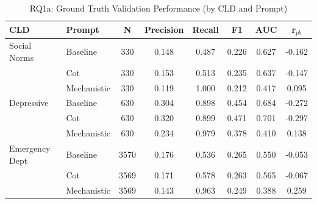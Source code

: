 \begin{table}[htbp]
\centering
\caption{RQ1a: Ground Truth Validation Performance (by CLD and Prompt)}
\label{tab:rq1a_gt_main}
\begin{tabular}{llcccccc}
\toprule
\textbf{CLD} & \textbf{Prompt} & \textbf{N} & \textbf{Precision} & \textbf{Recall} & \textbf{F1} & \textbf{AUC} & \textbf{r$_{pb}$} \\
\midrule
Social Norms & Baseline & 330 & 0.148 & 0.487 & 0.226 & 0.627 & -0.162 \\
 & Cot & 330 & 0.153 & 0.513 & 0.235 & 0.637 & -0.147 \\
 & Mechanistic & 330 & 0.119 & 1.000 & 0.212 & 0.417 & 0.095 \\
\midrule
Depressive & Baseline & 630 & 0.304 & 0.898 & 0.454 & 0.684 & -0.272 \\
 & Cot & 630 & 0.320 & 0.899 & 0.471 & 0.701 & -0.297 \\
 & Mechanistic & 630 & 0.234 & 0.979 & 0.378 & 0.410 & 0.138 \\
\midrule
Emergency Dept & Baseline & 3570 & 0.176 & 0.536 & 0.265 & 0.550 & -0.053 \\
 & Cot & 3569 & 0.171 & 0.578 & 0.263 & 0.565 & -0.067 \\
 & Mechanistic & 3569 & 0.143 & 0.963 & 0.249 & 0.388 & 0.259 \\
\midrule
\bottomrule
\end{tabular}
\end{table}